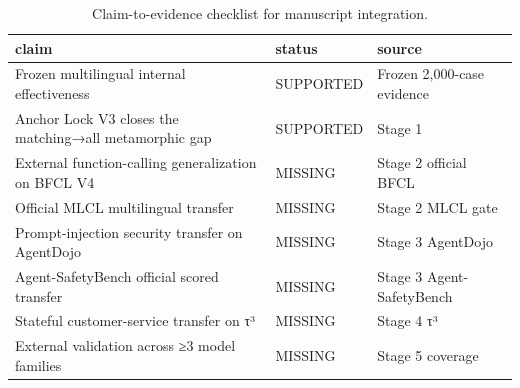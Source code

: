 \begin{table}
\caption{Claim-to-evidence checklist for manuscript integration.}
\label{tab:claim-evidence}
\begin{tabular}{lll}
\toprule
claim & status & source \\
\midrule
Frozen multilingual internal effectiveness & SUPPORTED & Frozen 2,000-case evidence \\
Anchor Lock V3 closes the matching→all metamorphic gap & SUPPORTED & Stage 1 \\
External function-calling generalization on BFCL V4 & MISSING & Stage 2 official BFCL \\
Official MLCL multilingual transfer & MISSING & Stage 2 MLCL gate \\
Prompt-injection security transfer on AgentDojo & MISSING & Stage 3 AgentDojo \\
Agent-SafetyBench official scored transfer & MISSING & Stage 3 Agent-SafetyBench \\
Stateful customer-service transfer on τ³ & MISSING & Stage 4 τ³ \\
External validation across ≥3 model families & MISSING & Stage 5 coverage \\
\bottomrule
\end{tabular}
\end{table}

